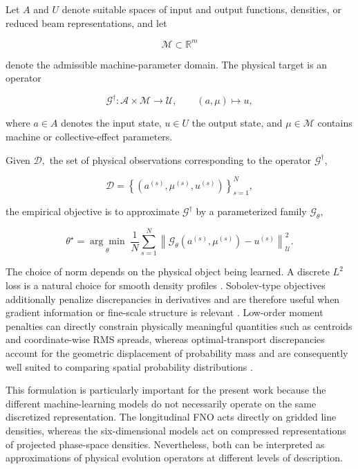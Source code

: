 Let \(A\) and \(U\) denote suitable spaces of input and output functions, densities, or reduced beam representations, and let

\begin{equation}
\label{eq:63}
\mathcal M\subset\mathbb R^m
\end{equation}

denote the admissible machine-parameter domain. The physical target is an operator

\begin{equation}
\label{eq:64}
\mathcal G^{\dagger}:\mathcal A\times\mathcal M\longrightarrow\mathcal U,\qquad(a,\mu)\longmapsto u,
\end{equation}

where \(a \in A\) denotes the input state, \(u \in U\) the output state, and \(\mu \in \mathcal{M}\) contains machine or collective-effect parameters.

Given \(\mathcal{D} ,\) the set of physical observations corresponding to the operator \(\mathcal{G}^{\dagger} ,\)

\begin{equation}
\label{eq:65}
\mathcal D=\left\{\left(a^{(s)},\mu^{(s)},u^{(s)}\right)\right\}_{s=1}^{N},
\end{equation}

the empirical objective is to approximate \(\mathcal{G}^{\dagger}\) by a parameterized family \(\mathcal{G}_{\theta} ,\)

\begin{equation}
\label{eq:66}
\theta^{\star}=\underset\theta{\arg\min}\;\frac1N\sum_{s=1}^{N}\left\|\mathcal G_{\theta}\left(a^{(s)},\mu^{(s)}\right)-u^{(s)}\right\|_{\mathcal U}^{2}.
\end{equation}

The choice of norm depends on the physical object being learned. A discrete \(L^{2}\) loss is a natural choice for smooth density profiles \cite{kovachki2023operators}. Sobolev-type objectives additionally penalize discrepancies in derivatives and are therefore useful when gradient information or fine-scale structure is relevant \cite{adams2003sobolev}. Low-order moment penalties can directly constrain physically meaningful quantities such as centroids and coordinate-wise RMS spreads, whereas optimal-transport discrepancies account for the geometric displacement of probability mass and are consequently well suited to comparing spatial probability distributions \cite{peyre2019transport}.

This formulation is particularly important for the present work because the different machine-learning models do not necessarily operate on the same discretized representation. The longitudinal FNO acts directly on gridded line densities, whereas the six-dimensional models act on compressed representations of projected phase-space densities. Nevertheless, both can be interpreted as approximations of physical evolution operators at different levels of description.

